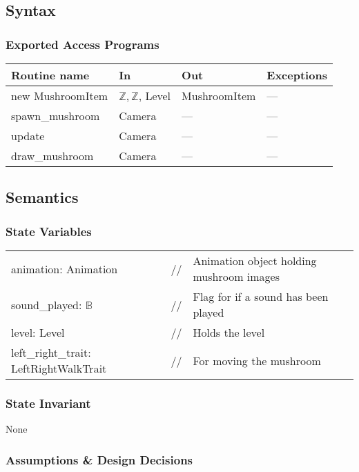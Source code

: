 \documentclass[12pt]{article}
\begin{document}
\subsection* {Syntax}

\subsubsection* {Exported Access Programs}

\begin{tabular}{| l | l | l | l |}
\hline
\textbf{Routine name} & \textbf{In} & \textbf{Out} & \textbf{Exceptions}\\
\hline
new MushroomItem & $\mathbb{Z, Z}$, Level & MushroomItem & ---\\
\hline
spawn\_mushroom & Camera & --- & ---\\
\hline
update & Camera & --- & ---\\
\hline
draw\_mushroom & Camera & --- & ---\\
\hline
\end{tabular}

\subsection* {Semantics}

\subsubsection* {State Variables}
\begin{tabular}{lll}
animation: Animation & // & Animation object holding mushroom images\\
sound\_played: $\mathbb{B}$ & // & Flag for if a sound has been played\\
level: Level & // & Holds the level\\
left\_right\_trait: LeftRightWalkTrait & // & For moving the mushroom\\
\end{tabular}

\subsubsection* {State Invariant}

None

\subsubsection* {Assumptions \& Design Decisions}
\end{document}
